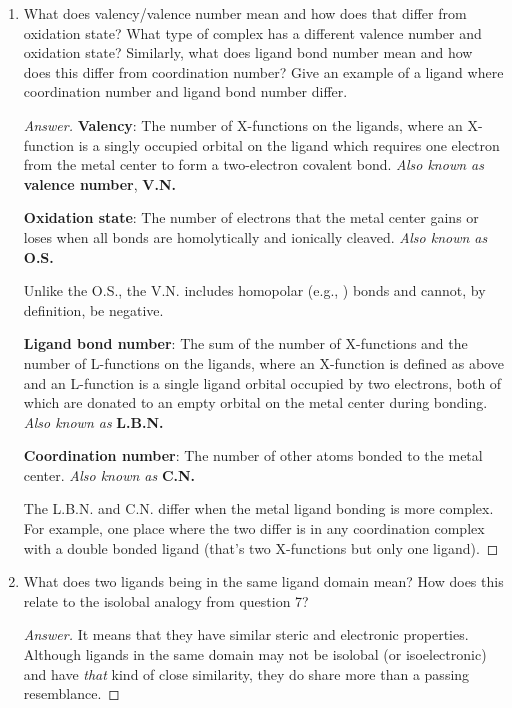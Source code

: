 \documentclass[../psets.tex]{subfiles}
\begin{document}
\begin{enumerate}
\begin{enumerate}[label={\alph*)}]
\begin{proof}[Answer]
\begin{figure}[H]
\begin{subfigure}[b]{0.3\linewidth}
                \end{subfigure}
                \caption{Different ways sulfate can bind to a metal center.}
                \label{fig:pset1-8d-answer}
            \end{figure}
        \end{proof}
        \item What does valency/valence number mean and how does that differ from oxidation state? What type of complex has a different valence number and oxidation state? Similarly, what does ligand bond number mean and how does this differ from coordination number? Give an example of a ligand where coordination number and ligand bond number differ.
        \begin{proof}[Answer]
            \textbf{Valency}: The number of X-functions on the ligands, where an X-function is a singly occupied orbital on the ligand which requires one electron from the metal center to form a two-electron covalent bond. \emph{Also known as} \textbf{valence number}, \textbf{V.N.}\par
            \textbf{Oxidation state}: The number of electrons that the metal center gains or loses when all bonds are homolytically and ionically cleaved. \emph{Also known as} \textbf{O.S.}\par
            Unlike the O.S., the V.N. includes homopolar (e.g., ) bonds and cannot, by definition, be negative.\par
            \textbf{Ligand bond number}: The sum of the number of X-functions and the number of L-functions on the ligands, where an X-function is defined as above and an L-function is a single ligand orbital occupied by two electrons, both of which are donated to an empty orbital on the metal center during bonding. \emph{Also known as} \textbf{L.B.N.}\par
            \textbf{Coordination number}: The number of other atoms bonded to the metal center. \emph{Also known as} \textbf{C.N.}\par
            The L.B.N. and C.N. differ when the metal ligand bonding is more complex. For example, one place where the two differ is in any coordination complex with a double bonded ligand (that's two X-functions but only one ligand).
        \end{proof}
        \item What does two ligands being in the same ligand domain mean? How does this relate to the isolobal analogy from question 7?
        \begin{proof}[Answer]
            It means that they have similar steric and electronic properties. Although ligands in the same domain may not be isolobal (or isoelectronic) and have \emph{that} kind of close similarity, they do share more than a passing resemblance.
        \end{proof}
    \end{enumerate}
\end{enumerate}
\end{document}
